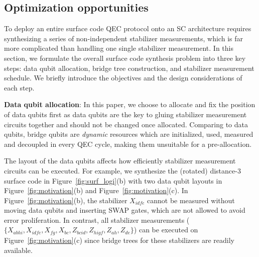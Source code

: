 \subsection{Optimization opportunities}

To deploy an entire surface code QEC protocol onto an SC architecture requires synthesizing a series of non-independent stabilizer measurements, which is far more complicated than handling one single stabilizer measurement.
In this section, we formulate the overall surface code synthesis problem into three key steps: data qubit allocation, bridge tree construction, and stabilizer measurement schedule.
We briefly introduce the objectives and the design considerations of each step.






\textbf{Data qubit allocation}: In this paper, we choose to allocate and fix the position of data qubits first as data qubits are the key to gluing stabilizer measurement circuits together and should not be changed once allocated.  
Comparing to data qubits, bridge qubits are \textit{dynamic} resources which are initialized, used, measured and decoupled in every QEC cycle, making them unsuitable for a pre-allocation.

The layout of the data qubits %
affects how efficiently stabilizer measurement circuits can be executed.
For example, we synthesize the (rotated) distance-3 surface code in Figure~\ref{fig:surf_logi}(b) with two data qubit layouts in Figure~\ref{fig:motivation}(b) and Figure~\ref{fig:motivation}(c).
In Figure~\ref{fig:motivation}(b), the stabilizer $X_{idfe}$ cannot be measured without moving data qubits and inserting SWAP gates, which are not allowed to avoid error proliferation.%
 In contrast, all stabilizer measurements ($\{X_{abhi}, X_{idfe}, X_{fg}, X_{bc}, Z_{bcid}, Z_{higf}, Z_{ah}, Z_{de} \}$) can be executed on Figure~\ref{fig:motivation}(c) since bridge trees for these stabilizers are readily available.








